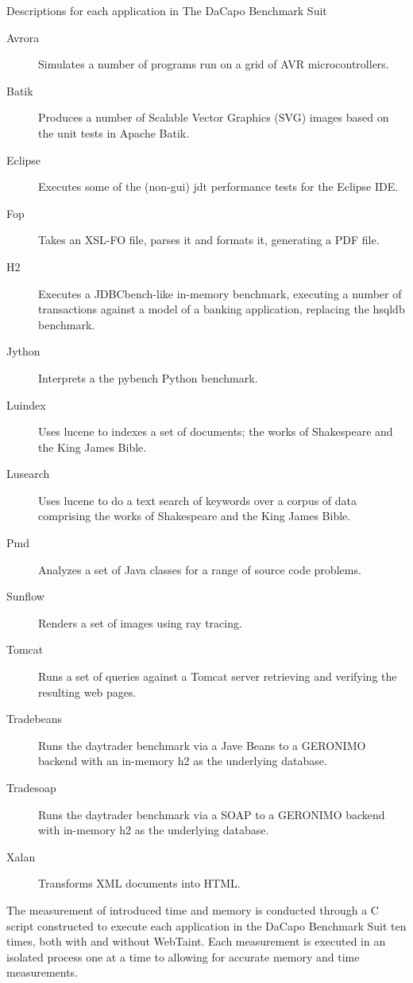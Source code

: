 \begin{table}[H]
  \centering
  \caption{Descriptions for each application in The DaCapo Benchmark Suit \parencite{dacapoBench}}
    \label{table:DaCapoTests}
    \begin{description}
        \item [Avrora] Simulates a number of programs run on a grid of AVR microcontrollers.
        \item [Batik] Produces a number of Scalable Vector Graphics (SVG) images based on the unit tests in Apache Batik.
        \item [Eclipse] Executes some of the (non-gui) jdt performance tests for the Eclipse IDE.
        \item [Fop] Takes an XSL-FO file, parses it and formats it, generating a PDF file.
        \item [H2] Executes a JDBCbench-like in-memory benchmark, executing a number of transactions against a model of a banking application, replacing the hsqldb benchmark.
        \item [Jython] Interprets a the pybench Python benchmark.
        \item [Luindex] Uses lucene to indexes a set of documents; the works of Shakespeare and the King James Bible.
        \item [Lusearch] Uses lucene to do a text search of keywords over a corpus of data comprising the works of Shakespeare and the King James Bible.
        \item [Pmd] Analyzes a set of Java classes for a range of source code problems.
        \item [Sunflow] Renders a set of images using ray tracing.
        \item [Tomcat] Runs a set of queries against a Tomcat server retrieving and verifying the resulting web pages.
        \item [Tradebeans] Runs the daytrader benchmark via a Jave Beans to a GERONIMO backend with an in-memory h2 as the underlying database.
        \item [Tradesoap] Runs the daytrader benchmark via a SOAP to a GERONIMO backend with in-memory h2 as the underlying database.
        \item [Xalan] Transforms XML documents into HTML.
    \end{description}
\end{table}

The measurement of introduced time and memory is conducted through a C script constructed to execute each application in the DaCapo Benchmark Suit ten times, both with and without WebTaint. Each measurement is executed in an isolated process one at a time to allowing for accurate memory and time measurements.